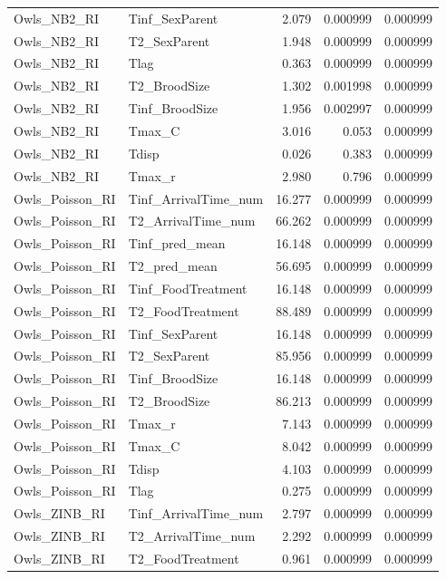 \begin{landscape}
\begin{center}
\begin{longtable}{llrrr}
Owls\_NB2\_RI & Tinf\_SexParent & 2.079 & 0.000999 & 0.000999 \\
Owls\_NB2\_RI & T2\_SexParent & 1.948 & 0.000999 & 0.000999 \\
Owls\_NB2\_RI & Tlag & 0.363 & 0.000999 & 0.000999 \\
Owls\_NB2\_RI & T2\_BroodSize & 1.302 & 0.001998 & 0.000999 \\
Owls\_NB2\_RI & Tinf\_BroodSize & 1.956 & 0.002997 & 0.000999 \\
Owls\_NB2\_RI & Tmax\_C & 3.016 & 0.053 & 0.000999 \\
Owls\_NB2\_RI & Tdisp & 0.026 & 0.383 & 0.000999 \\
Owls\_NB2\_RI & Tmax\_r & 2.980 & 0.796 & 0.000999 \\
Owls\_Poisson\_RI & Tinf\_ArrivalTime\_num & 16.277 & 0.000999 & 0.000999 \\
Owls\_Poisson\_RI & T2\_ArrivalTime\_num & 66.262 & 0.000999 & 0.000999 \\
Owls\_Poisson\_RI & Tinf\_pred\_mean & 16.148 & 0.000999 & 0.000999 \\
Owls\_Poisson\_RI & T2\_pred\_mean & 56.695 & 0.000999 & 0.000999 \\
Owls\_Poisson\_RI & Tinf\_FoodTreatment & 16.148 & 0.000999 & 0.000999 \\
Owls\_Poisson\_RI & T2\_FoodTreatment & 88.489 & 0.000999 & 0.000999 \\
Owls\_Poisson\_RI & Tinf\_SexParent & 16.148 & 0.000999 & 0.000999 \\
Owls\_Poisson\_RI & T2\_SexParent & 85.956 & 0.000999 & 0.000999 \\
Owls\_Poisson\_RI & Tinf\_BroodSize & 16.148 & 0.000999 & 0.000999 \\
Owls\_Poisson\_RI & T2\_BroodSize & 86.213 & 0.000999 & 0.000999 \\
Owls\_Poisson\_RI & Tmax\_r & 7.143 & 0.000999 & 0.000999 \\
Owls\_Poisson\_RI & Tmax\_C & 8.042 & 0.000999 & 0.000999 \\
Owls\_Poisson\_RI & Tdisp & 4.103 & 0.000999 & 0.000999 \\
Owls\_Poisson\_RI & Tlag & 0.275 & 0.000999 & 0.000999 \\
Owls\_ZINB\_RI & Tinf\_ArrivalTime\_num & 2.797 & 0.000999 & 0.000999 \\
Owls\_ZINB\_RI & T2\_ArrivalTime\_num & 2.292 & 0.000999 & 0.000999 \\
Owls\_ZINB\_RI & T2\_FoodTreatment & 0.961 & 0.000999 & 0.000999 \\

\end{longtable}
\end{center}
\end{landscape}

